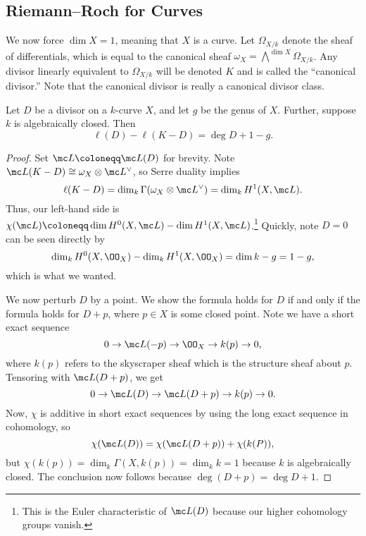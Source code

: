 \documentclass[../notes.tex]{subfiles}
\begin{document}
\subsection{Riemann--Roch for Curves}
We now force $\dim X=1$, meaning that $X$ is a curve. Let $\Omega_{X/k}$ denote the sheaf of differentials, which is equal to the canonical sheaf $\omega_X=\bigwedge^{\dim X}\Omega_{X/k}$. Any divisor linearly equivalent to $\Omega_{X/k}$ will be denoted $K$ and is called the ``canonical divisor.'' Note that the canonical divisor is really a canonical divisor class.
\begin{theorem} \label{thm:rr}
	Let $D$ be a divisor on a $k$-curve $X$, and let $g$ be the genus of $X$. Further, suppose $k$ is algebraically closed. Then
	\[\ell(D)-\ell(K-D)=\deg D+1-g.\]
\end{theorem}
\begin{proof}
	Set $\mc L\coloneqq\mc L(D)$ for brevity. Note $\mc L(K-D)\cong\omega_X\otimes\mc L^\lor$, so Serre duality implies
	\[\ell(K-D)=\dim_k\Gamma(\omega_X\otimes\mc L^\lor)=\dim_kH^1(X,\mc L).\]
	Thus, our left-hand side is $\chi(\mc L)\coloneqq\dim H^0(X,\mc L)-\dim H^1(X,\mc L)$.\footnote{This is the Euler characteristic of $\mc L(D)$ because our higher cohomology groups vanish.} Quickly, note $D=0$ can be seen directly by
	\[\dim_kH^0(X,\OO_X)-\dim_kH^1(X,\OO_X)=\dim k-g=1-g,\]
	which is what we wanted.

	We now perturb $D$ by a point. We show the formula holds for $D$ if and only if the formula holds for $D+p$, where $p\in X$ is some closed point. Note we have a short exact sequence
	\[0\to\mc L(-p)\to\OO_X\to k(p)\to0,\]
	where $k(p)$ refers to the skyscraper sheaf which is the structure sheaf about $p$. Tensoring with $\mc L(D+p)$, we get
	\[0\to\mc L(D)\to\mc L(D+p)\to k(p)\to0.\]
	Now, $\chi$ is additive in short exact sequences by using the long exact sequence in cohomology, so
	\[\chi(\mc L(D))=\chi(\mc L(D+p))+\chi(k(P)),\]
	but $\chi(k(p))=\dim_k\Gamma(X,k(p))=\dim_kk=1$ because $k$ is algebraically closed. The conclusion now follows because $\deg(D+p)=\deg D+1$.
\end{proof}
\end{document}
